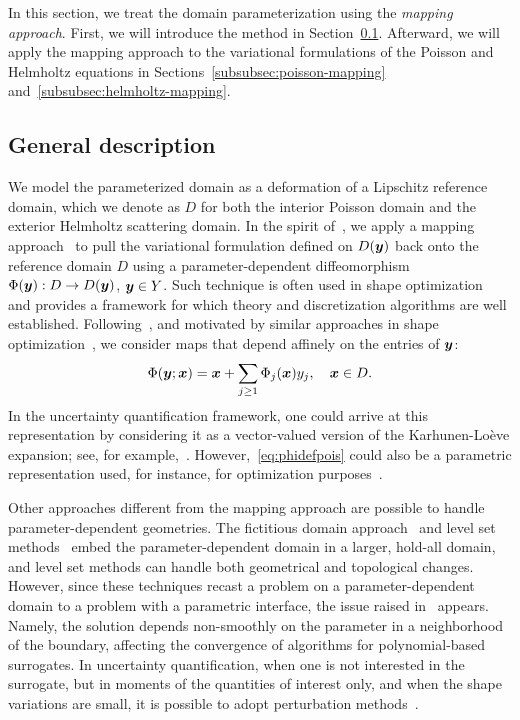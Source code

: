 In this section, we treat the domain parameterization using the \emph{mapping approach}.
First, we will introduce the method in Section~\ref{subsubsec:mapping-approach}.
Afterward, we will apply the mapping approach to the variational formulations of the Poisson and Helmholtz equations in Sections~\ref{subsubsec:poisson-mapping} and~\ref{subsubsec:helmholtz-mapping}.

\subsection{General description}\label{subsubsec:mapping-approach}
We model the parameterized domain as a deformation of a Lipschitz reference domain, which we denote as ${D}$ for both the interior Poisson domain and the exterior Helmholtz scattering domain.
In the spirit of~\cite{castrillon-candas2016,harbrecht2016,hiptmair2018}, we apply a mapping approach~\cite{tartakovsky2006,xiu2006} to pull the variational formulation defined on ${D}({\bm{y}})$ back onto the reference domain ${D}$ using a parameter-dependent diffeomorphism $\Phi({\bm{y}}) :{D} \to {D}({\bm{y}})$, ${\bm{y}}\in Y$.
Such technique is often used in shape optimization~\cite{haubner2021,haubner2020,hiptmair2015,onyshkevych2021} and provides a framework for which theory and discretization algorithms are well established.
Following~\cite{cohen2018}, and motivated by similar approaches in shape optimization~\cite{haubner2020}, we consider maps that depend affinely on the entries of ${\bm{y}}$:
\begin{equation}
    \Phi({\bm{y}}; {{\bm{x}}}) = {{\bm{x}}} + \sum_{j\geq 1} \Phi_j({\bm{x}})y_j,\quad {{\bm{x}}} \in {D}.\label{eq:phidefpois}
\end{equation}
In the uncertainty quantification framework, one could arrive at this representation by considering it as a vector-valued version of the Kar\-hun\-en-\-Loève expansion; see, for example,~\cite{harbrecht2016}.
However,~\eqref{eq:phidefpois} could also be a parametric representation used, for instance, for optimization purposes~\cite{hicks1978,martins2022,hiptmair2015}.

Other approaches different from the mapping approach are possible to handle parameter-dependent geometries.
The fictitious domain approach~\cite{canuto2007} and level set methods~\cite{nouy2008,nouy2007, osher2001} embed the parameter-dependent domain in a larger, hold-all domain, and level set methods can handle both geometrical and topological changes.
However, since these techniques recast a problem on a parameter-dependent domain to a problem with a parametric interface, the issue raised in~\cite{motamed2013,scarabosio2017,scarabosio2022} appears.
Namely, the solution depends non-smoothly on the parameter in a neighborhood of the boundary, affecting the convergence of algorithms for polynomial-based surrogates.
In uncertainty quantification, when one is not interested in the surrogate, but in moments of the quantities of interest only, and when the shape variations are small, it is possible to adopt perturbation methods~\cite{dambrine2016,harbrecht2013,harbrecht2008}.


